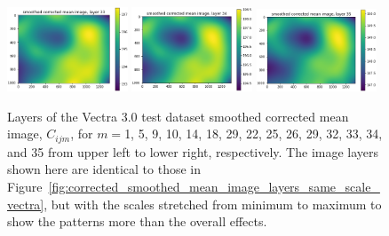\documentclass[letterpaper,11pt]{article}
\newcommand{\reffig}[1]{Figure~\ref{#1}}
\begin{document}
\begin{figure}[!ht]
\includegraphics[width=0.32\textwidth]{images/results/smoothed_corrected_mean_image_layers_vectra/smoothed_corrected_mean_image_layer_33}
\includegraphics[width=0.32\textwidth]{images/results/smoothed_corrected_mean_image_layers_vectra/smoothed_corrected_mean_image_layer_34}
\includegraphics[width=0.32\textwidth]{images/results/smoothed_corrected_mean_image_layers_vectra/smoothed_corrected_mean_image_layer_35}
\caption{\footnotesize Layers of the Vectra 3.0 test dataset smoothed corrected mean image, $C_{ijm}$, for $m=$1, 5, 9, 10, 14, 18, 29, 22, 25, 26, 29, 32, 33, 34, and 35 from upper left to lower right, respectively. The image layers shown here are identical to those in \reffig{fig:corrected_smoothed_mean_image_layers_same_scale_vectra}, but with the scales stretched from minimum to maximum to show the patterns more than the overall effects.}
\label{fig:corrected_smoothed_mean_image_layers_vectra}
\end{figure}
\end{document}
